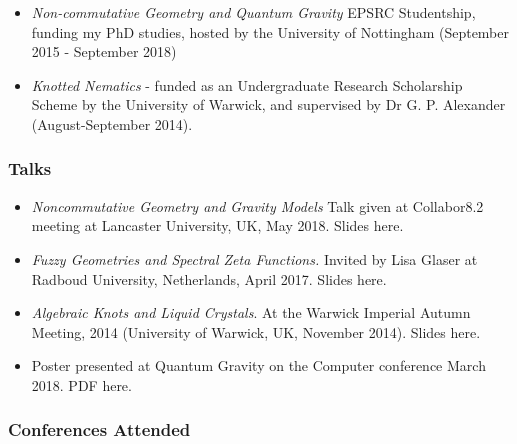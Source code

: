 \documentclass[a4paper,12pt]{article}
\begin{document}
\begin{itemize}
\tightlist
\item
  \emph{Non-commutative Geometry and Quantum Gravity} EPSRC Studentship,
  funding my PhD studies, hosted by the University of Nottingham
  (September 2015 - September 2018)
\item
  \emph{Knotted Nematics} - funded as an Undergraduate Research
  Scholarship Scheme by the University of Warwick, and supervised by Dr
  G. P. Alexander (August-September 2014).
\end{itemize}

\hypertarget{talks}{%
\subsubsection{Talks}\label{talks}}

\begin{itemize}
\tightlist
\item
  \emph{Noncommutative Geometry and Gravity Models} Talk given at
  Collabor8.2 meeting at Lancaster University, UK, May 2018. Slides
  here.
\item
  \emph{Fuzzy Geometries and Spectral Zeta Functions.} Invited by Lisa
  Glaser at Radboud University, Netherlands, April 2017. Slides here.
\item
  \emph{Algebraic Knots and Liquid Crystals}. At the Warwick Imperial
  Autumn Meeting, 2014 (University of Warwick, UK, November 2014).
  Slides here.
\item
  Poster presented at Quantum Gravity on the Computer conference March
  2018. PDF here.
\end{itemize}

\hypertarget{conferences-attended}{%
\subsubsection{Conferences Attended}\label{conferences-attended}}
\end{document}

